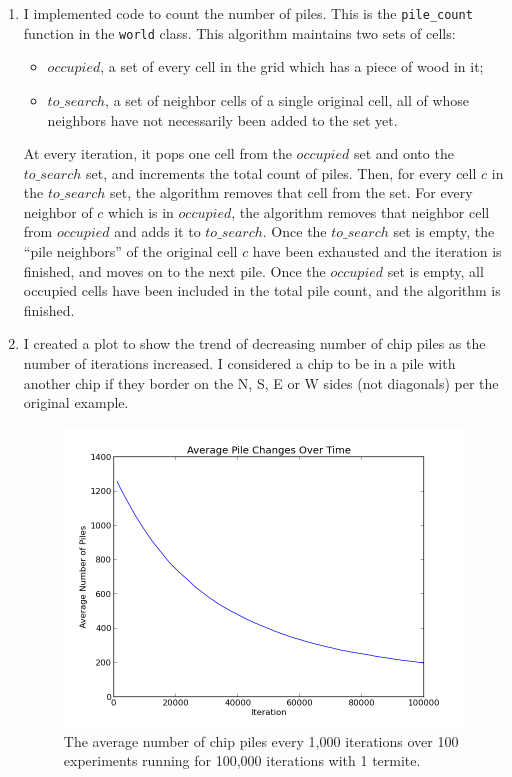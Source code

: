 \documentclass{article}
\begin{document}
\begin{enumerate}
\item{} %

I implemented code to count the number of piles. This is the \texttt{pile\_count}
function in the \texttt{world} class. This algorithm maintains two sets of
cells:

\begin{itemize}
    \item $occupied$, a set of every cell in the grid which has a piece of wood in it;
    \item $to\_search$, a set of neighbor cells of a single original cell, all
    of whose neighbors have not necessarily been added to the set yet. 

\end{itemize}

At every iteration, it pops one cell from the $occupied$ set and onto the
$to\_search$ set, and increments the total count of piles. Then, for every cell
$c$ in the $to\_search$ set, the algorithm removes that cell from the set. For
every neighbor of $c$ which is in $occupied$, the algorithm removes that
neighbor cell from $occupied$ and adds it to $to\_search$. Once the $to\_search$
set is empty, the ``pile neighbors'' of the original cell $c$ have been
exhausted and the iteration is finished, and moves on to the next pile. Once the
$occupied$ set is empty, all occupied cells have been included in the total pile
count, and the algorithm is finished.

\item{} %

I created a plot to show the trend of decreasing number of chip piles as the
number of iterations increased. I considered a chip to be in a pile with another
chip if they border on the N, S, E or W sides (not diagonals) per the original
example.

\begin{figure}[H]
\centering
\label{single}
\includegraphics[width=\textwidth]{figs/part_3.png}
\caption{The average number of chip piles every 1,000 iterations over 100
experiments running for 100,000 iterations with 1 termite.}
\end{figure}


\end{enumerate}
\end{document}
